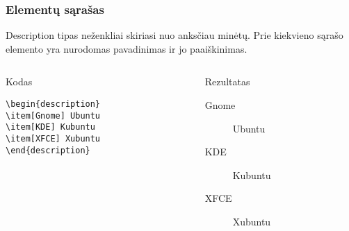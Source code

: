 \documentclass[11pt,a4paper]{beamer}
\begin{document}
\begin{frame}[fragile]
    \frametitle{Elementų sąrašas}
    Description tipas neženkliai skiriasi nuo anksčiau minėtų. Prie kiekvieno
    sąrašo elemento yra nurodomas pavadinimas ir jo paaiškinimas.
    \begin{columns}[t]
        \begin{column}{5cm}
            \begin{block}{Kodas}
                \begin{lstlisting}
\begin{description}
\item[Gnome] Ubuntu
\item[KDE] Kubuntu
\item[XFCE] Xubuntu 
\end{description}
                \end{lstlisting}
            \end{block}
        \end{column}
        \begin{column}{5cm}
            \begin{block}{Rezultatas}
                \begin{description}
                \item[Gnome] Ubuntu
                \item[KDE] Kubuntu
                \item[XFCE] Xubuntu 
                \end{description}
            \end{block}
        \end{column}
    \end{columns}
\end{frame}
\end{document}
